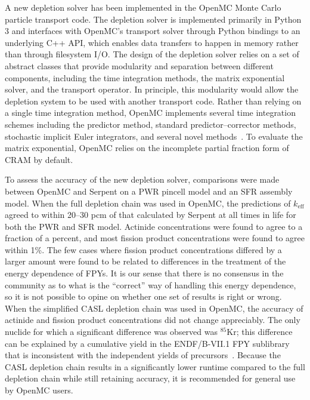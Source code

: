 \documentclass[3p,authoryear]{elsarticle}
\begin{document}
A new depletion solver has been implemented in the OpenMC Monte Carlo particle
transport code. The depletion solver is implemented primarily in Python 3 and
interfaces with OpenMC's transport solver through Python bindings to an
underlying C++ API, which enables data transfers to happen in memory rather than
through filesystem I/O. The design of the depletion solver relies on a set of
abstract classes that provide modularity and separation between different
components, including the time integration methods, the matrix exponential
solver, and the transport operator. In principle, this modularity would allow
the depletion system to be used with another transport code. Rather than relying
on a single time integration method, OpenMC implements several time integration
schemes including the predictor method, standard predictor--corrector methods,
stochastic implicit Euler integrators, and several novel
methods~\citep{josey2017phd, josey2017jcp}. To evaluate the matrix exponential,
OpenMC relies on the incomplete partial fraction form of CRAM by default.

To assess the accuracy of the new depletion solver, comparisons were made
between OpenMC and Serpent on a PWR pincell model and an SFR assembly model.
When the full depletion chain was used in OpenMC, the predictions of
$k_\text{eff}$ agreed to within 20--30 pcm of that calculated by Serpent at all
times in life for both the PWR and SFR model. Actinide concentrations were found
to agree to a fraction of a percent, and most fission product concentrations
were found to agree within 1\%. The few cases where fission product
concentrations differed by a larger amount were found to be related to
differences in the treatment of the energy dependence of FPYs. It is our sense
that there is no consensus in the community as to what is the ``correct'' way of
handling this energy dependence, so it is not possible to opine on whether one
set of results is right or wrong. When the simplified CASL depletion chain was
used in OpenMC, the accuracy of actinide and fission product concentrations did
not change appreciably. The only nuclide for which a significant difference was
observed was $^{85}$Kr; this difference can be explained by a cumulative yield
in the ENDF/B-VII.1 FPY sublibrary that is inconsistent with the independent
yields of precursors~\citep{pigni2015nds}. Because the CASL depletion chain
results in a significantly lower runtime compared to the full depletion chain
while still retaining accuracy, it is recommended for general use by OpenMC
users.
\end{document}
